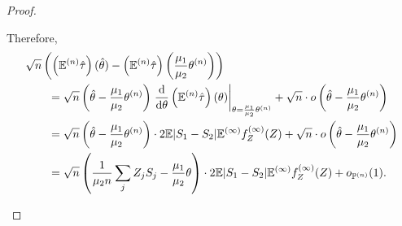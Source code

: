 \documentclass[12pt]{article}
\newcommand{\z}{Z}
\newcommand{\s}{S}
\newcommand{\zs}[2]{\frac{\z_{#1}-\z_{#2}}{\s_{#1}-\s_{#2}}}
\let\n\relax
\newcommand{\n}[1]{{#1}^{(n)}}
\newcommand{\En}{E^{(n)}}
\newcommand{\EE}{\mathbb{E}}
\newcommand{\EEn}{\mathbb{E}^{(n)}}
\newcommand{\EEinf}{\mathbb{E}^{(\infty)}}
\newcommand{\Pn}{P^{(n)}}
\newcommand{\PP}{\mathbb{P}}
\newcommand{\PPn}{\mathbb{P}^{(n)}}
\newcommand{\thetan}{\theta^{(n)}}
\newcommand{\E}{E}
\begin{document}
\begin{proof}
\begin{enumerate}[wide, labelwidth=!, labelindent=0pt]
Therefore,
\begin{align}
  &\sqrt{n}\left(\left(\EEn\hat\tau\right)(\hat\theta)-\left(\EEn\hat\tau\right)\left(\frac{\mu_1}{\mu_2}\thetan\right)\right)\\
  &\qquad=\sqrt{n}\left(\hat\theta-\frac{\mu_1}{\mu_2}\thetan\right)\left.\frac{\text{d}}{\text{d}\theta}\left(\EEn\hat\tau\right)(\theta)\right|_{\theta=\frac{\mu_1}{\mu_2}\thetan} + \sqrt{n}\cdot o\left(\hat\theta-\frac{\mu_1}{\mu_2}\thetan\right)\\
  &\qquad=\sqrt{n}\left(\hat\theta-\frac{\mu_1}{\mu_2}\thetan\right)\cdot 2 \EE|\s_1-\s_2|\EEinf f_{\z}^{(\infty)}(\z) + \sqrt{n}\cdot o\left(\hat\theta-\frac{\mu_1}{\mu_2}\thetan\right)\\
  &\qquad=\sqrt{n}\left(\frac{1}{\mu_2n}\sum_j\z_j\s_j-\frac{\mu_1}{\mu_2}\n{\theta}\right)\cdot 2 \EE|\s_1-\s_2|\EEinf f_{\z}^{(\infty)}(\z) + o_{\PPn}(1).
\end{align}



\end{enumerate}
\end{proof}
\end{document}
